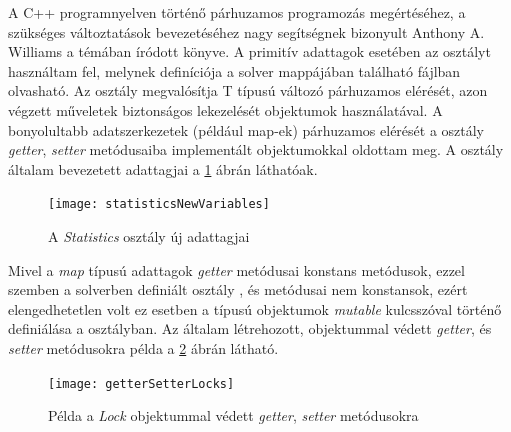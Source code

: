 A C++ programnyelven történő párhuzamos programozás megértéséhez, a szükséges változtatások bevezetéséhez nagy segítségnek bizonyult Anthony A. Williams a témában íródott könyve. \cite{CppConcurrency}
A primitív adattagok esetében az  osztályt használtam fel, melynek definíciója a solver  mappájában található  fájlban olvasható.
Az osztály megvalósítja T típusú változó párhuzamos elérését, azon végzett műveletek biztonságos lekezelését  objektumok használatával.
A bonyolultabb adatszerkezetek (például map-ek) párhuzamos elérését a  osztály \textit{getter}, \textit{setter} metódusaiba implementált  objektumokkal oldottam meg.
A  osztály általam bevezetett adattagjai a \ref{StatisticsVariables} ábrán láthatóak.
\begin{figure}[H]
\begin{center}
\texttt{[image: statisticsNewVariables]}
\caption{A \textit{Statistics} osztály új adattagjai}
\label{StatisticsVariables}
\end{center}
\end{figure}
Mivel a \textit{map} típusú adattagok \textit{getter} metódusai konstans metódusok, ezzel szemben a solverben definiált  osztály , és  metódusai nem konstansok, ezért elengedhetetlen volt ez esetben a  típusú objektumok \textit{mutable} kulcsszóval történő definiálása a  osztályban.
Az általam létrehozott,  objektummal védett \textit{getter}, és \textit{setter} metódusokra példa a \ref{GetterSetterLock} ábrán látható.
\begin{figure}[H]
\begin{center}
\texttt{[image: getterSetterLocks]}
\caption{Példa a \textit{Lock} objektummal védett \textit{getter}, \textit{setter} metódusokra}
\label{GetterSetterLock}
\end{center}
\end{figure}
